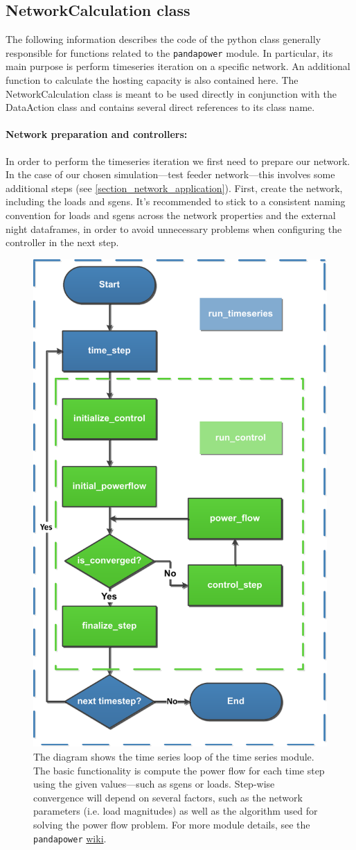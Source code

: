 \documentclass[a4paper,10pt]{report}
\begin{document}
\subsection{NetworkCalculation class}
The following information describes the code of the python class generally responsible for functions related to the \texttt{pandapower} module. In particular, its main purpose is perform timeseries iteration on a specific network. An additional function to calculate the hosting capacity is also contained here. The NetworkCalculation class is meant to be used directly in conjunction with the DataAction class and contains several direct references to its class name.

\paragraph{Network preparation and controllers:} In order to perform the timeseries iteration we first need to prepare our network. In the case of our chosen simulation---test feeder network---this involves some additional steps (see \cref{section_network_application}). First, create the network, including the loads and sgens. It's recommended to stick to a consistent naming convention for loads and sgens across the network properties and the external night dataframes, in order to avoid unnecessary problems when configuring the controller in the next step.

\FloatBarrier
\begin{figure}[htpb]
	\centering
	\includegraphics[width=0.32\linewidth]{timeseries_module_diag.pdf}
	\caption[\texttt{pandapower} times series module overview]{The diagram shows the time series loop of the time series module. The basic functionality is compute the power flow for each time step using the given values---such as sgens or loads. Step-wise convergence will depend on several factors, such as the network parameters (i.e. load magnitudes) as well as the algorithm used for solving the power flow problem. For more module details, see the \texttt{pandapower}  \href{https://pandapower.readthedocs.io/en/v2.10.1/timeseries/timeseries_loop.html}{wiki}.}
	\label{timeseries_module_diag}
\end{figure}
\FloatBarrier
\end{document}
